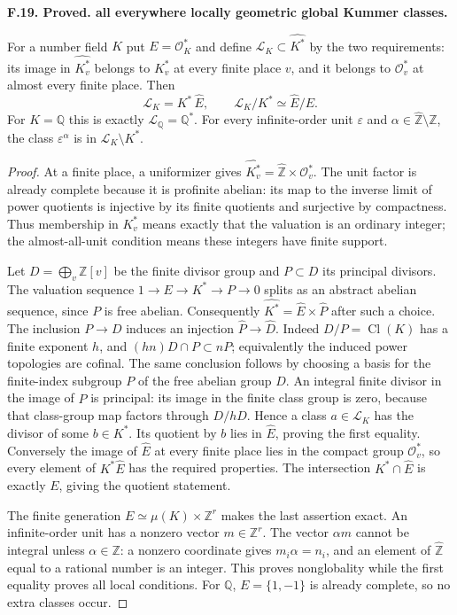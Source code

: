 \documentclass[11pt,oneside]{article}
\makeatletter
\newcounter{statementanchor}
\newenvironment{statement}[3]{%
 \refstepcounter{statementanchor}\def\@currentlabel{#1}%
 \par\addvspace{9pt}\noindent
 \textbf{#1. #2. #3.}\par\nobreak\noindent\ignorespaces
}{\par\addvspace{5pt}}
\makeatother
\begin{document}
\begin{statement}{F.19}{Proved}{all everywhere locally geometric global Kummer classes}
\label{st:F.19}
\label{F-local-global-units}
For a number field $K$ put $E=\mathcal O_K^*$ and define
$\mathcal L_K\subset\widehat{K^*}$ by the two requirements:
its image in $\widehat{K_v^*}$ belongs to $K_v^*$ at every finite
place $v$, and it belongs to $\mathcal O_v^*$ at almost every
finite place. Then
\[
 \mathcal L_K=K^*\,\widehat E,\qquad
 \mathcal L_K/K^*\simeq\widehat E/E.                          \tag{F.4}
\]
For $K=\mathbb Q$ this is exactly $\mathcal L_{\mathbb Q}=\mathbb Q^*$.
For every infinite-order unit $\varepsilon$ and
$\alpha\in\widehat{\mathbb Z}\setminus\mathbb Z$, the class
$\varepsilon^\alpha$ is in $\mathcal L_K\setminus K^*$.
\end{statement}
\begin{proof}
At a finite place, a uniformizer gives
$\widehat{K_v^*}=\widehat{\mathbb Z}\times\mathcal O_v^*$.
The unit factor is already complete because it is profinite
abelian: its map to the inverse limit of power quotients is
injective by its finite quotients and surjective by compactness.
Thus membership in $K_v^*$ means exactly that the valuation is
an ordinary integer; the almost-all-unit condition means these
integers have finite support.

Let $D=\bigoplus_v\mathbb Z[v]$ be the finite divisor group and
$P\subset D$ its principal divisors. The valuation sequence
$1\to E\to K^*\to P\to0$ splits as an abstract abelian sequence,
since $P$ is free abelian. Consequently
$\widehat{K^*}=\widehat E\times\widehat P$ after such a choice.
The inclusion $P\to D$ induces an injection
$\widehat P\to\widehat D$. Indeed $D/P=\operatorname{Cl}(K)$
has a finite exponent $h$, and
$(hn)D\cap P\subset nP$; equivalently the induced power
topologies are cofinal. The same conclusion follows by choosing
a basis for the finite-index subgroup $P$ of the free abelian
group $D$. An integral finite divisor in the image of
$\widehat P$ is principal: its image in the finite class group
is zero, because that class-group map factors through $D/hD$.
Hence a class $a\in\mathcal L_K$ has the divisor of some
$b\in K^*$. Its quotient by $b$ lies in $\widehat E$, proving
the first equality. Conversely the image of $\widehat E$ at
every finite place lies in the compact group $\mathcal O_v^*$,
so every element of $K^*\widehat E$ has the required properties.
The intersection $K^*\cap\widehat E$ is exactly $E$, giving
the quotient statement.

The finite generation $E\simeq\mu(K)\times\mathbb Z^r$
makes the last assertion exact. An infinite-order unit has a
nonzero vector $m\in\mathbb Z^r$. The vector $\alpha m$
cannot be integral unless $\alpha\in\mathbb Z$: a nonzero
coordinate gives $m_i\alpha=n_i$, and an element of
$\widehat{\mathbb Z}$ equal to a rational number is an integer.
This proves nonglobality while the first equality proves all
local conditions. For $\mathbb Q$, $E=\{1,-1\}$ is already
complete, so no extra classes occur.
\end{proof}
\end{document}
